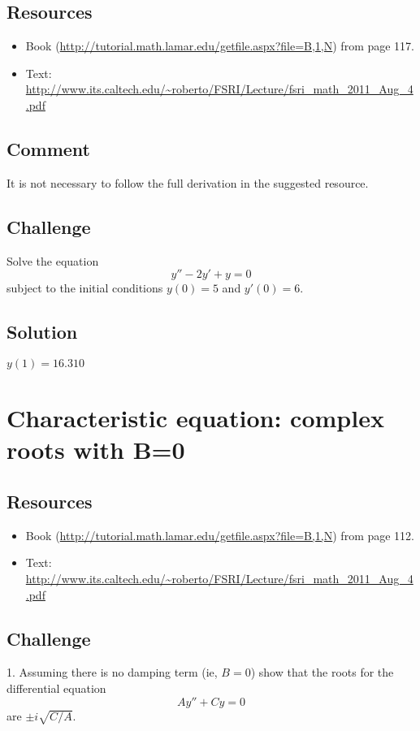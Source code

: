 \subsection*{Resources}
\begin{itemize}
    \item Book (\url{http://tutorial.math.lamar.edu/getfile.aspx?file=B,1,N}) from page 117.
    \item Text: \url{http://www.its.caltech.edu/~roberto/FSRI/Lecture/fsri_math_2011_Aug_4.pdf}
\end{itemize}

\subsection*{Comment}
It is not necessary to follow the full derivation in the suggested resource.

\subsection*{Challenge}
Solve the equation
\begin{equation}
    y'' - 2y' + y = 0
\end{equation}
subject to the initial conditions $y(0)=5$ and $y'(0)=6$.

\subsection*{Solution}
$y(1)=16.310$




\newpage
\section{Characteristic equation: complex roots with B=0}

\subsection*{Resources}
\begin{itemize}
    \item Book (\url{http://tutorial.math.lamar.edu/getfile.aspx?file=B,1,N}) from page 112.
    \item Text: \url{http://www.its.caltech.edu/~roberto/FSRI/Lecture/fsri_math_2011_Aug_4.pdf}
\end{itemize}

\subsection*{Challenge}
1. Assuming there is no damping term (ie, $B=0$) show that the roots for the differential equation
\begin{equation}
    A y'' + Cy = 0
\end{equation}
are $\pm i \sqrt{C/A}$.

